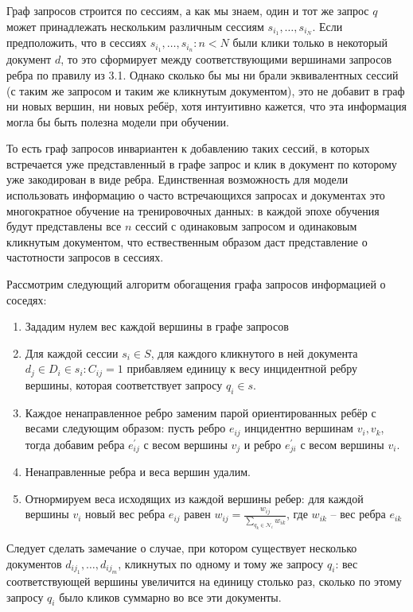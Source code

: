 \documentclass[diploma]{nanolab2015}
\begin{document}
Граф запросов строится по сессиям, а как мы знаем, один и тот же запрос $q$ может принадлежать нескольким различным сессиям ${s_{i_1}, \dots , s_{i_N}}$. Если предположить, что в сессиях $s_{i_1}, \dots , s_{i_n} : n < N$ были клики только в некоторый документ $d$, то это сформирует между соответствующими вершинами запросов ребра по правилу из 3.1. Однако сколько бы мы ни брали эквивалентных сессий (с таким же запросом и таким же кликнутым документом), это не добавит в граф ни новых вершин, ни новых ребёр, хотя интуитивно кажется, что эта информация могла бы быть полезна модели при обучении.

То есть граф запросов инвариантен к добавлению таких сессий, в которых встречается уже представленный в графе запрос и клик в документ по которому уже закодирован в виде ребра. Единственная возможность для модели использовать информацию о часто встречающихся запросах и документах это многократное обучение на тренировочных данных: в каждой эпохе обучения будут представлены все $n$ сессий с одинаковым запросом и одинаковым кликнутым документом, что ествественным образом даст представление о частотности запросов в сессиях.

Рассмотрим следующий алгоритм обогащения графа запросов информацией о соседях:
\begin{enumerate}
    [
    leftmargin=*,
    label={Шаг \arabic*.}
    ]
    \item Зададим нулем вес каждой вершины в графе запросов
    \item Для каждой сессии $s_i \in S$, для каждого кликнутого в ней документа $d_j \in D_i \in s_i : C_{ij} = 1$ прибавляем единицу к весу инцидентной ребру вершины, которая соответствует запросу $q_i \in s$.
    \item Каждое ненаправленное ребро заменим парой ориентированных ребёр с весами следующим образом: пусть ребро $e_{ij}$ инцидентно вершинам $v_i, v_k$, тогда добавим ребра $e_{ij}^{'}$ с весом вершины $v_j$ и ребро $e_{ji}^{'}$ с весом вершины $v_i$.
    \item Ненаправленные ребра и веса вершин удалим.
    \item Отнормируем веса исходящих из каждой вершины ребер: для каждой вершины $v_i$ новый вес ребра $e_{ij}$ равен $ w_{ij} = \frac{w_{ij}}{\sum_{q_k \in \mathcal{N}_i} w_{ik} }$, где $w_{ik}$ -- вес ребра $e_{ik}$
\end{enumerate}

Следует сделать замечание о случае, при котором существует несколько документов $d_{ij_{1}}, \dots , d_{ij_{m}}$, кликнутых по одному и тому же запросу $q_i$: вес соответствующей вершины увеличится на единицу столько раз, сколько по этому запросу $q_i$ было кликов суммарно во все эти документы.
\end{document}

